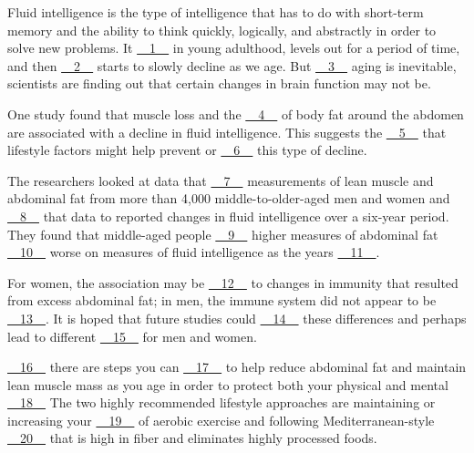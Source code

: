 Fluid intelligence is the type of intelligence that has to do with short-term memory and the ability to think quickly, logically, and abstractly in order to solve new problems. It \uline{~~1~~} in young adulthood, levels out for a period of time, and then \uline{~~2~~} starts to slowly decline as we age. But \uline{~~3~~} aging is inevitable, scientists are finding out that certain changes in brain function may not be.


One study found that muscle loss and the \uline{~~4~~} of body fat around the abdomen are associated with a decline in fluid intelligence. This suggests the \uline{~~5~~} that lifestyle factors might help prevent or \uline{~~6~~} this type of decline.


The researchers looked at data that \uline{~~7~~} measurements of lean muscle and abdominal fat from more than 4,000 middle-to-older-aged men and women and \uline{~~8~~} that data to reported changes in fluid intelligence over a six-year period. They found that middle-aged people \uline{~~9~~} higher measures of abdominal fat \uline{~~10~~} worse on measures of fluid intelligence as the years \uline{~~11~~}.


For women, the association may be \uline{~~12~~} to changes in immunity that resulted from excess abdominal fat; in men, the immune system did not appear to be \uline{~~13~~}. It is hoped that future studies could \uline{~~14~~} these differences and perhaps lead to different \uline{~~15~~} for men and women.


\uline{~~16~~} there are steps you can \uline{~~17~~} to help reduce abdominal fat and maintain lean muscle mass as you age in order to protect both your physical and mental \uline{~~18~~} The two highly recommended lifestyle approaches are maintaining or increasing your \uline{~~19~~} of aerobic exercise and following Mediterranean-style \uline{~~20~~} that is high in fiber and eliminates highly processed foods.